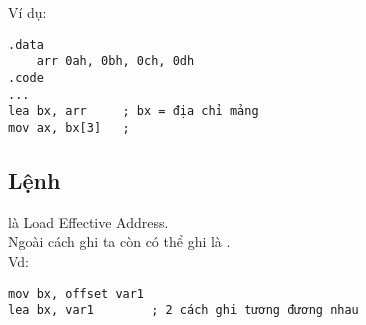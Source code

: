 \documentclass[main.tex]{subfiles}
\begin{document}
Ví dụ:
\begin{verbatim}
.data 
    arr 0ah, 0bh, 0ch, 0dh 
.code 
... 
lea bx, arr     ; bx = địa chỉ mảng 
mov ax, bx[3]   ; 
\end{verbatim}

\subsection{Lệnh }
 là Load Effective Address.\\
Ngoài cách ghi  ta còn có thể ghi là .\\
Vd:
\begin{verbatim}
mov bx, offset var1 
lea bx, var1        ; 2 cách ghi tương đương nhau
\end{verbatim}
\end{document}
